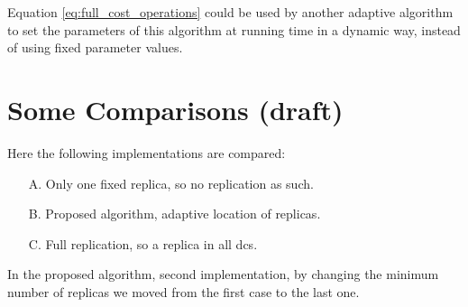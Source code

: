 \documentclass{acm_proc_article-sp}
\begin{document}
Equation \ref{eq:full_cost_operations} could be used by another adaptive algorithm to set the parameters of this algorithm at running time in a dynamic way, instead of using fixed parameter values.


\section{Some Comparisons (draft)}
Here the following implementations are compared:
\begin{itemize}
	\item[A.] Only one fixed replica, so no replication as such.
	
	\item[B.] Proposed algorithm, adaptive location of replicas.

	\item[C.] Full replication, so a replica in all \glspl{dc}.
\end{itemize}

In the proposed algorithm, second implementation, by changing the minimum number of replicas we moved from the first case to the last one.
\end{document}
